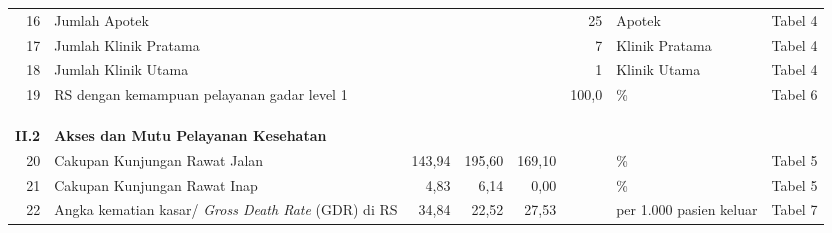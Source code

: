 \begin{small}
\begin{longtable}{rY{12em}rrrrY{5em}Y{5em}}
	                   16 & Jumlah Apotek                                                                         &        &        &         &                25 & Apotek                         & Tabel 4  \\
	 17 & Jumlah Klinik Pratama                                                                 &        &        &         &                 7 & Klinik Pratama                 & Tabel 4  \\
	                   18 & Jumlah Klinik Utama                                                                   &        &        &         &                 1 & Klinik Utama                   & Tabel 4  \\
	 19 & RS dengan kemampuan pelayanan gadar level 1                                           &        &        &         &             100,0 & \%                             & Tabel 6  \\
	                      &                                                                                       &        &        &         &                   &                                &          \\
                          &                                                                                       &        &        &         &                   &                                &          \\
                          &                                                                                       &        &        &         &                   &                                &          \\
	        \textbf{II.2} & \textbf{Akses dan Mutu Pelayanan Kesehatan}                                           &        &        &         &                   &                                &          \\
	                   20 & Cakupan Kunjungan Rawat Jalan                                                         & 143,94 & 195,60 &  169,10 &                   & \%                             & Tabel 5  \\
	 21 & Cakupan Kunjungan Rawat Inap                                                          &   4,83 &   6,14 &    0,00 &                   & \%                             & Tabel 5  \\
	                   22 & Angka kematian kasar/ \emph{Gross Death Rate} (GDR) di RS                             &  34,84 &  22,52 &   27,53 &                   & per 1.000 pasien keluar        & Tabel 7  \\

\end{longtable}
\end{small}
